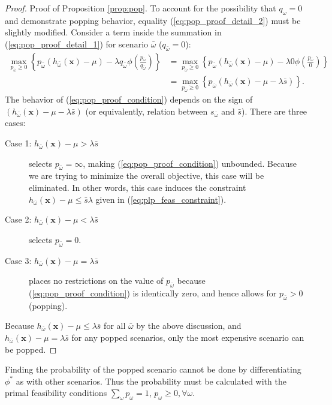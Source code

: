 \documentclass[opre,nonblindrev]{informs3} %
\newcommand{\x}{\mathbf{x}}
\begin{document}
\begin{proof}{\sc Proof of Proposition \ref{prop:pop}.}
	To account for the possibility that $q_\omega = 0$ and demonstrate popping behavior, equality (\ref{eq:pop_proof_detail_2}) must be slightly modified.
	Consider a term inside the summation in (\ref{eq:pop_proof_detail_1}) for scenario $\bar{\omega}$  ($q_{\bar{\omega}} = 0$):
	\begin{align}
		\max_{p_{\bar{\omega}} \geq 0} \left\{ p_{\bar{\omega}} (h_{\bar{\omega}}(\x) - \mu) - \lambda q_{\bar{\omega}}  \phi\left(\frac{p_{\bar{\omega}}}{q_{\bar{\omega}}}\right) \right\} & = \max_{p_{\bar{\omega}} \geq 0} \left\{ p_{\bar{\omega}} (h_{\bar{\omega}}(\x) - \mu) - \lambda 0  \phi\left(\frac{p_{\bar{\omega}}}{0}\right) \right\} \nonumber \\
		& = \max_{p_{\bar{\omega}} \geq 0} \left\{ p_{\bar{\omega}} \left( h_{\bar{\omega}}(\x) - \mu - \lambda \bar{s} \right) \right\}. \label{eq:pop_proof_condition}
	\end{align}
	The behavior of (\ref{eq:pop_proof_condition}) depends on the sign of $\left( h_{\bar{\omega}}(\x) - \mu - \lambda \bar{s}  \right)$ (or equivalently, relation between $s_{\bar{\omega}}$ and $\bar{s}$).
	There are three cases:
	\begin{description}
		\item[Case 1: $h_{\bar{\omega}}(\x) - \mu > \lambda \bar{s}$] selects $p_{\bar{\omega}} = \infty$, making (\ref{eq:pop_proof_condition}) unbounded. 
			Because we are trying to minimize the overall objective, this case will be eliminated. 
			In other words, this case induces the constraint $h_{\bar{\omega}}(\x) - \mu \leq \bar{s} \lambda$ given in (\ref{eq:plp_feas_constraint}). 
		\item[Case 2:  $h_{\bar{\omega}}(\x) - \mu < \lambda \bar{s}$] selects $p_{\bar{\omega}} = 0$.
		\item[Case 3: $h_{\bar{\omega}}(\x) - \mu = \lambda \bar{s}$] places no restrictions on the value of $p_{\bar{\omega}}$ because (\ref{eq:pop_proof_condition}) is identically zero, and hence allows for $p_{\bar{\omega}} > 0$ (popping). 
	\end{description}
	Because $h_{\bar{\omega}}(\x) - \mu \leq \lambda \bar{s}$ for all ${\bar{\omega}}$ by the above discussion, and $h_{\bar{\omega}}(\x) - \mu = \lambda \bar{s}$ for any popped scenarios, only the most expensive scenario can be popped.
	\Halmos
\end{proof}


\begin{remark}
	Finding the probability of the popped scenario cannot be done by differentiating $\phi^*$ as with other scenarios.
Thus the probability must be calculated with the primal feasibility conditions $\sum_\omega p_\omega = 1$, $p_\omega \geq 0, \forall \omega$.
\end{remark}
\end{document}

